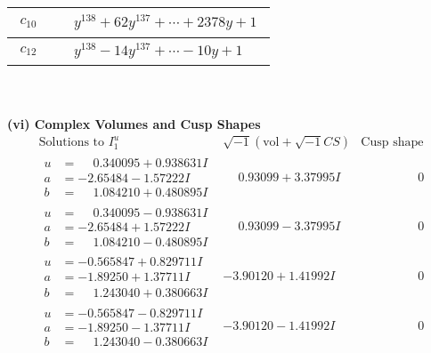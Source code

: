 \documentclass[1p]{elsarticle_modified}
\theoremstyle{definition}
\newcommand{\I}{\sqrt{-1}}
\begin{document}
\begin{tabular}{m{50pt}|m{274pt}}
\hline $$\begin{aligned}c_{10}\end{aligned}$$&$\begin{aligned}
&y^{138}+62 y^{137}+\cdots+2378 y+1
\end{aligned}$\\
\hline $$\begin{aligned}c_{12}\end{aligned}$$&$\begin{aligned}
&y^{138}-14 y^{137}+\cdots-10 y+1
\end{aligned}$\\
\hline
\end{tabular}\\~\\
\newpage\flushleft \textbf{(vi) Complex Volumes and Cusp Shapes}
$$\begin{array}{c|c|c}  
\text{Solutions to }I^u_{1}& \I (\text{vol} + \sqrt{-1}CS) & \text{Cusp shape}\\
 \hline 
\begin{aligned}
u &= \phantom{-}0.340095 + 0.938631 I \\
a &= -2.65484 - 1.57222 I \\
b &= \phantom{-}1.084210 + 0.480895 I\end{aligned}
 & \phantom{-}0.93099 + 3.37995 I & \phantom{-0.000000 } 0 \\ \hline\begin{aligned}
u &= \phantom{-}0.340095 - 0.938631 I \\
a &= -2.65484 + 1.57222 I \\
b &= \phantom{-}1.084210 - 0.480895 I\end{aligned}
 & \phantom{-}0.93099 - 3.37995 I & \phantom{-0.000000 } 0 \\ \hline\begin{aligned}
u &= -0.565847 + 0.829711 I \\
a &= -1.89250 + 1.37711 I \\
b &= \phantom{-}1.243040 + 0.380663 I\end{aligned}
 & -3.90120 + 1.41992 I & \phantom{-0.000000 } 0 \\ \hline\begin{aligned}
u &= -0.565847 - 0.829711 I \\
a &= -1.89250 - 1.37711 I \\
b &= \phantom{-}1.243040 - 0.380663 I\end{aligned}
 & -3.90120 - 1.41992 I & \phantom{-0.000000 } 0 \\ \hline\begin{aligned}

\end{aligned}
\end{array}$$
\end{document}
